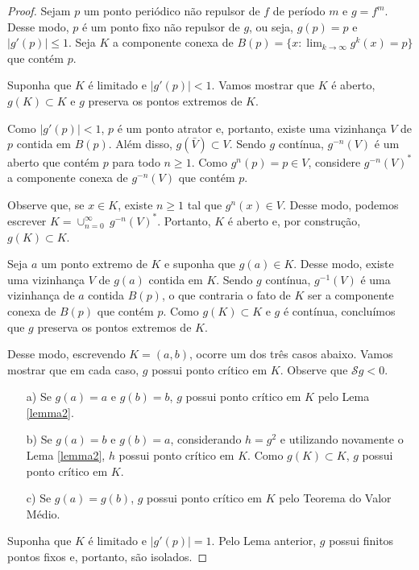 \begin{proof}
Sejam $p$ um ponto periódico não repulsor de $f$ de período $m$ e $g = f^m$. Desse modo, $p$ é um ponto fixo não repulsor de $g$, ou seja, $g(p) = p$ e $|g'(p)| \leq 1$. Seja $K$ a componente conexa de $B(p) = \{ x : \lim_{k \to \infty} g^k(x) = p \}$ que contém $p$.

Suponha que $K$ é limitado e $|g'(p)| < 1$. Vamos mostrar que $K$ é aberto, $g(K) \subset K$ e $g$ preserva os pontos extremos de $K$.

Como $|g'(p)| < 1$, $p$ é um ponto atrator e, portanto, existe uma vizinhança $V$ de $p$ contida em $B(p)$. Além disso, $g(\bar{V}) \subset V$. Sendo $g$ contínua, $g^{-n}(V)$ é um aberto que contém $p$ para todo $n \geq 1$. Como $g^n(p) = p \in V$, considere $g^{-n}(V)^*$ a componente conexa de $g^{-n}(V)$ que contém $p$.

Observe que, se $x \in K$, existe $n \geq 1$ tal que $g^n(x) \in V$. Desse modo, podemos escrever $K = \cup^{\infty}_{n = 0} \ g^{-n}(V)^*$. Portanto, $K$ é aberto e, por construção, $g(K) \subset K$.

Seja $a$ um ponto extremo de $K$ e suponha que $g(a) \in K$. Desse modo, existe uma vizinhança $V$ de $g(a)$ contida em $K$. Sendo $g$ contínua, $g^{-1}(V)$ é uma vizinhança de $a$ contida $B(p)$, o que contraria o fato de $K$ ser a componente conexa de $B(p)$ que contém $p$. Como $g(K) \subset K$ e $g$ é contínua, concluímos que $g$ preserva os pontos extremos de $K$.

Desse modo, escrevendo $K = (a, b)$, ocorre um dos três casos abaixo. Vamos mostrar que em cada caso, $g$ possui ponto crítico em $K$. Observe que $\mathcal{S} g < 0$.

\begin{enumerate}

\item[a)] Se $g(a) = a$ e $g(b) = b$, $g$ possui ponto crítico em $K$ pelo Lema \ref{lemma2}.
\item[b)] Se $g(a) = b$ e $g(b) = a$,  considerando $h = g^2$ e utilizando novamente o Lema \ref{lemma2}, $h$ possui ponto crítico em $K$. Como $g(K) \subset K$, $g$ possui ponto crítico em $K$.
\item[c)] Se $g(a) = g(b)$, $g$ possui ponto crítico em $K$ pelo Teorema do Valor Médio.
\end{enumerate}

Suponha que $K$ é limitado e $|g'(p)| = 1$. Pelo Lema anterior, $g$ possui finitos pontos fixos e, portanto, são isolados.


\end{proof}
